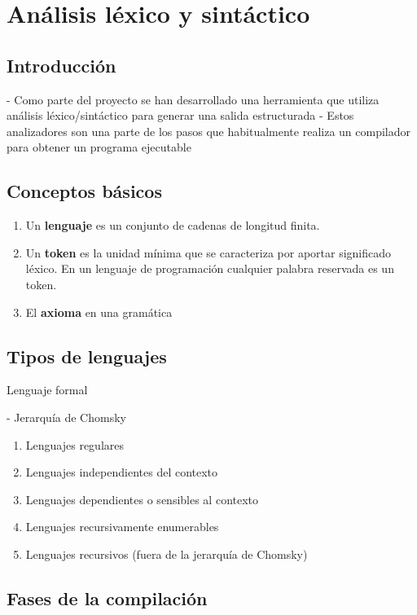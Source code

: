 \section{Análisis léxico y sintáctico}

\subsection{Introducción}

- Como parte del proyecto se han desarrollado una herramienta que utiliza análisis léxico/sintáctico para generar una salida estructurada
- Estos analizadores son una parte de los pasos que habitualmente realiza un compilador para obtener un programa ejecutable


\subsection{Conceptos básicos}

\begin{enumerate}
    \item Un \textbf{lenguaje} es un conjunto de cadenas de longitud finita.
    \item Un \textbf{token} es la unidad mínima que se caracteriza por aportar significado léxico. En un lenguaje de programación cualquier palabra reservada es un token.
    \item El \textbf{axioma} en una gramática
\end{enumerate}

\subsection{Tipos de lenguajes}

Lenguaje formal

- Jerarquía de Chomsky

\begin{enumerate}
    \item Lenguajes regulares
    \item Lenguajes independientes del contexto
    \item Lenguajes dependientes o sensibles al contexto
    \item Lenguajes recursivamente enumerables
    \item Lenguajes recursivos (fuera de la jerarquía de Chomsky)
\end{enumerate}

\subsection{Fases de la compilación}

